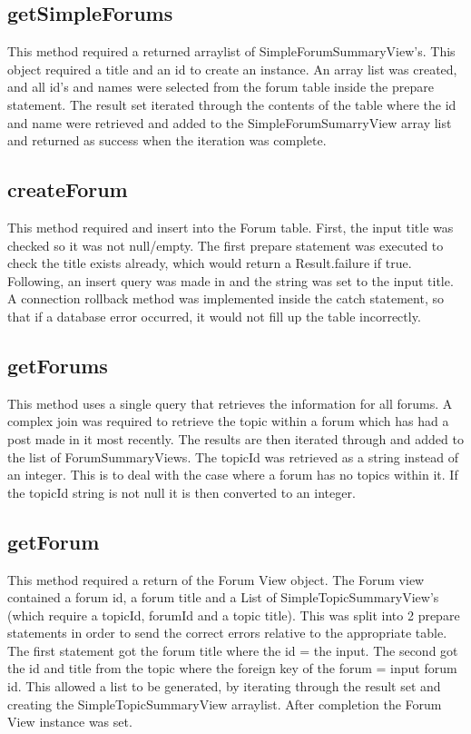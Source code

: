 \documentclass{article}
\begin{document}
\subsection*{getSimpleForums}

This method required a returned arraylist of SimpleForumSummaryView's. This object required a title and an id to create an instance. An array list was created, and all id's and names were selected from the forum table inside the prepare statement. The result set iterated through the contents of the table where the id and name were retrieved and added to the SimpleForumSumarryView array list and returned as success when the iteration was complete.
\subsection*{createForum}

This method required and insert into the Forum table. First, the input title was checked so it was not null/empty. The first prepare statement was executed to check the title exists already, which would return a Result.failure if true. Following, an insert query was made in and the string was set to the input title. A connection rollback method was implemented inside the catch statement, so that if a database error occurred, it would not fill up the table incorrectly.

\subsection*{getForums}

This method uses a single query that retrieves the information for all forums. A complex join was required to retrieve the topic within a forum which has had a post made in it most recently. The results are then iterated through and added to the list of ForumSummaryViews. The topicId was retrieved as a string instead of an integer. This is to deal with the case where a forum has no topics within it. If the topicId string is not null it is then converted to an integer.

\subsection*{getForum}

This method required a return of the Forum View object. The Forum view contained a forum id, a forum title and a List of SimpleTopicSummaryView's (which require a topicId, forumId and a topic title). This was split into 2 prepare statements in order to send the correct errors relative to the appropriate table. The first statement got the forum title where the id = the input. The second got the id and title from the topic where the foreign key of the forum = input forum id. This allowed a list to be generated, by iterating through the result set and creating the SimpleTopicSummaryView arraylist. After completion the Forum View instance was set.
\end{document}
